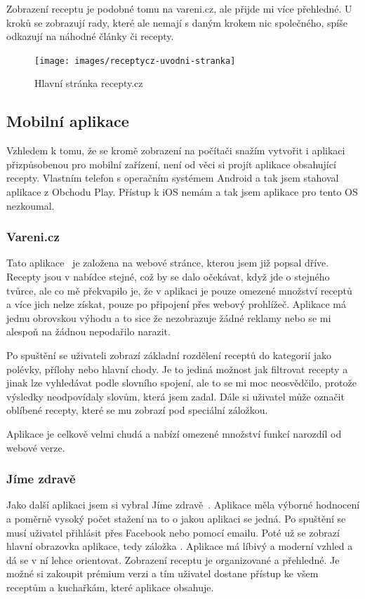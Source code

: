 Zobrazení receptu je podobné tomu na vareni.cz, ale přijde mi více přehledné. U kroků se zobrazují rady, které ale
nemají s daným krokem nic společného, spíše odkazují na náhodné články či recepty.

\newpage

\begin{figure}[H]
    \texttt{[image: images/receptycz-uvodni-stranka]}
    \caption{Hlavní stránka recepty.cz} \label{picture:receptycz:uvodni-stranka}
\end{figure}

\subsection{Mobilní aplikace}

Vzhledem k tomu, že se kromě zobrazení na počítači snažím vytvořit i aplikaci přizpůsobenou pro mobilní zařízení, není od věci
si projít aplikace obsahující recepty. Vlastním telefon s operačním systémem Android a tak jsem stahoval aplikace z Obchodu Play.
Přístup k iOS nemám a tak jsem aplikace pro tento OS nezkoumal.

\subsubsection{Vareni.cz}
Tato aplikace~\cite{VareniCZAplikace} je založena na webové stránce, kterou jsem již popsal dříve. Recepty jsou v nabídce stejné, což by se dalo očekávat,
když jde o stejného tvůrce, ale co mě překvapilo je, že v aplikaci je pouze omezené množství receptů a více jich nelze získat, pouze
po připojení přes webový prohlížeč. Aplikace má jednu obrovskou výhodu a to sice že nezobrazuje žádné reklamy nebo se mi alespoň na
žádnou nepodařilo narazit.

Po spuštění se uživateli zobrazí základní rozdělení receptů do kategorií jako polévky, přílohy nebo hlavní chody. Je to jediná možnost
jak filtrovat recepty a jinak lze vyhledávat podle slovního spojení, ale to se mi moc neosvědčilo, protože výsledky neodpovídaly slovům,
která jsem zadal. Dále si uživatel může označit oblíbené recepty, které se mu zobrazí pod speciální záložkou.

Aplikace je celkově velmi chudá a nabízí omezené množství funkcí narozdíl od webové verze.

\subsubsection{Jíme zdravě}
Jako další aplikaci jsem si vybral Jíme zdravě~\cite{JimeZdrave}. Aplikace měla výborné hodnocení a poměrně vysoký počet stažení na to o jakou aplikaci se jedná.
Po spuštění se musí uživatel přihlásit přes Facebook nebo pomocí emailu. Poté už se zobrazí hlavní obrazovka aplikace, tedy záložka .
Aplikace má líbivý a moderní vzhled a dá se v ní lehce orientovat. Zobrazení receptu je organizované a přehledné. Je možné si zakoupit
prémium verzi a tím uživatel dostane přístup ke všem receptům a kuchařkám, které aplikace obsahuje.

